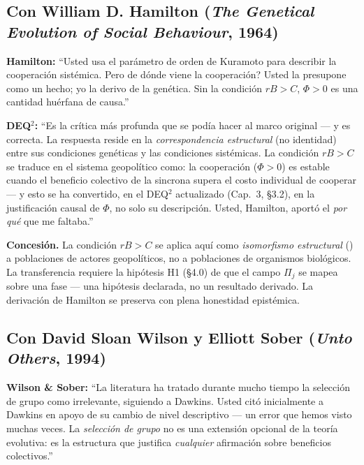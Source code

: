 \subsection{Con William D. Hamilton (\emph{The Genetical Evolution of
Social Behaviour}, 1964)}\label{con-hamilton-1964}

\textbf{Hamilton:} ``Usted usa el par\'{a}metro de orden de Kuramoto para
describir la cooperaci\'{o}n sist\'{e}mica. Pero \textquestiondown de
d\'{o}nde viene la cooperaci\'{o}n? Usted la presupone como un hecho; yo
la derivo de la gen\'{e}tica. Sin la condici\'{o}n $rB > C$, $\Phi > 0$
es una cantidad hu\'{e}rfana de causa.''

\textbf{DEQ$^2$:} ``Es la cr\'{i}tica m\'{a}s profunda que se pod\'{i}a
hacer al marco original --- y es correcta. La respuesta reside en la
\emph{correspondencia estructural} (no identidad) entre sus condiciones
gen\'{e}ticas y las condiciones sist\'{e}micas. La condici\'{o}n $rB > C$
se traduce en el sistema geopol\'{i}tico como: la cooperaci\'{o}n
($\Phi > 0$) es estable cuando el beneficio colectivo de la sincrona
supera el costo individual de cooperar --- y esto se ha convertido, en el
DEQ$^2$ actualizado (Cap.~3, §3.2), en la justificaci\'{o}n causal de
$\Phi$, no solo su descripci\'{o}n. Usted, Hamilton, aport\'{o} el
\emph{por qu\'{e}} que me faltaba.''

\textbf{Concesi\'{o}n.} La condici\'{o}n $rB > C$ se aplica aqu\'{i}
como \emph{isomorfismo estructural} (\Hypoth{}) a poblaciones de actores
geopol\'{i}ticos, no a poblaciones de organismos biol\'{o}gicos. La
transferencia requiere la hip\'{o}tesis H1 (§4.0) de que el campo $\Pi_j$
se mapea sobre una fase --- una hip\'{o}tesis declarada, no un resultado
derivado. La derivaci\'{o}n de Hamilton se preserva con plena honestidad
epist\'{e}mica.

\subsection{Con David Sloan Wilson y Elliott Sober (\emph{Unto Others},
1994)}\label{con-wilson-sober-1994}

\textbf{Wilson \& Sober:} ``La literatura ha tratado durante mucho tiempo
la selecci\'{o}n de grupo como irrelevante, siguiendo a Dawkins. Usted
cit\'{o} inicialmente a Dawkins en apoyo de su cambio de nivel descriptivo
--- un error que hemos visto muchas veces. La \emph{selecci\'{o}n de
grupo} no es una extensi\'{o}n opcional de la teor\'{i}a evolutiva: es la
estructura que justifica \emph{cualquier} afirmaci\'{o}n sobre beneficios
colectivos.''

